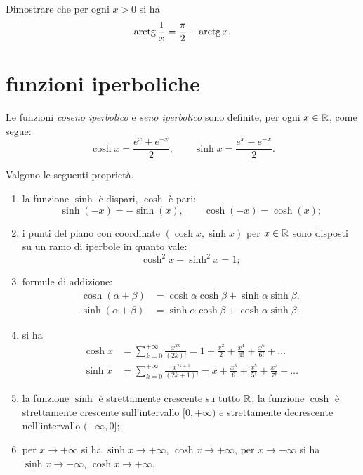\begin{exercise}
Dimostrare che per ogni $x>0$ si ha
\[
  \operatorname{arctg} \frac 1 x = \frac \pi 2 - \operatorname{arctg} x.
\]
\end{exercise}

\section{funzioni iperboliche}

\begin{definition}
Le funzioni
\emph{coseno iperbolico} e \emph{seno iperbolico}
sono definite, per ogni $x\in {\mathbb R}$,
come segue:
\mymargin{$\sinh$, $\cosh$}%
\index{$\sinh$, $\cosh$}%
%
%
%
\index{$\sinh$}%
\index{$\cosh$}%
\begin{equation}
\label{eq:sinh_cosh}
  \cosh x = \frac{e^x + e^{-x}}{2},
  \qquad
  \sinh x = \frac{e^x - e^{-x}}{2}.
\end{equation}
\end{definition}

\begin{theorem}
Valgono le seguenti proprietà.
\begin{enumerate}
\item
la funzione $\sinh$ è dispari, $\cosh$ è pari:
\[
\sinh(-x) = -\sinh(x),
\qquad
\cosh(-x) = \cosh(x);
\]

\item
i punti del piano con coordinate $(\cosh x, \sinh x)$
per $x\in {\mathbb R}$
sono disposti su un ramo di iperbole in quanto vale:
\[
  \cosh^2 x - \sinh^2 x = 1;
\]

\item formule di addizione:
\begin{align*}
  \cosh(\alpha+\beta) &= \cosh \alpha \cosh \beta + \sinh \alpha \sinh \beta,\\
  \sinh(\alpha+\beta) &= \sinh \alpha \cosh \beta + \cosh \alpha \sinh \beta;
\end{align*}

\item si ha
\begin{align*}
  \cosh x
  &= \sum_{k=0}^{+\infty} \frac{x^{2k}}{(2k)!}
  = 1 + \frac{x^2}{2} + \frac{x^4}{4!} + \frac{x^6}{6!} + \dots \\
  \sinh x
  &= \sum_{k=0}^{+\infty} \frac{x^{2k+1}}{(2k+1)!}
  = x + \frac{x^3}{6} + \frac{x^5}{5!} + \frac{x^7}{7!} + \dots
\end{align*}

\item
la funzione $\sinh$ è strettamente crescente su tutto ${\mathbb R}$,
la funzione $\cosh$
è strettamente crescente sull'intervallo
$[0,+\infty)$ e strettamente decrescente
nell'intervallo $(-\infty,0]$;

\item per $x\to +\infty$ si ha $\sinh x \to +\infty$, $\cosh x \to +\infty$, 
per $x\to -\infty$ si ha $\sinh x \to -\infty$, $\cosh x \to +\infty$.

\end{enumerate}
\end{theorem}


